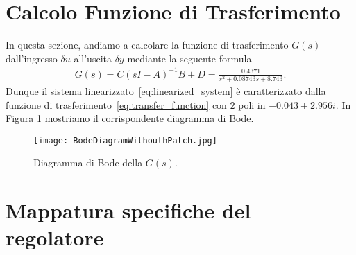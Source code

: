 \documentclass[a4paper, 11pt]{article}
\begin{document}
\section{Calcolo Funzione di Trasferimento}

In questa sezione, andiamo a calcolare la funzione di trasferimento $G(s)$ dall'ingresso $\delta u$ all'uscita $\delta y$ mediante la seguente formula 
%
%
\begin{align}\label{eq:transfer_function}
G(s) = C(sI - A)^{-1}B+D = \frac{0.4371}{s^2 + 0.08743 s + 8.743}.
\end{align}
%
Dunque il sistema linearizzato~\eqref{eq:linearized_system} è caratterizzato dalla funzione di trasferimento~\eqref{eq:transfer_function} con $2$ poli in $-0.043 \pm 2.956i$. In Figura \ref{fig:G} mostriamo il corrispondente diagramma di Bode. 

\begin{figure}[h]
	\centering
	\texttt{[image: BodeDiagramWithouthPatch.jpg]}
	\caption{Diagramma di Bode della $G(s)$.}
	\label{fig:G}
\end{figure}

\newcommand{\dB}{\text{dB}}

\section{Mappatura specifiche del regolatore}
\label{sec:specifications}
\end{document}
